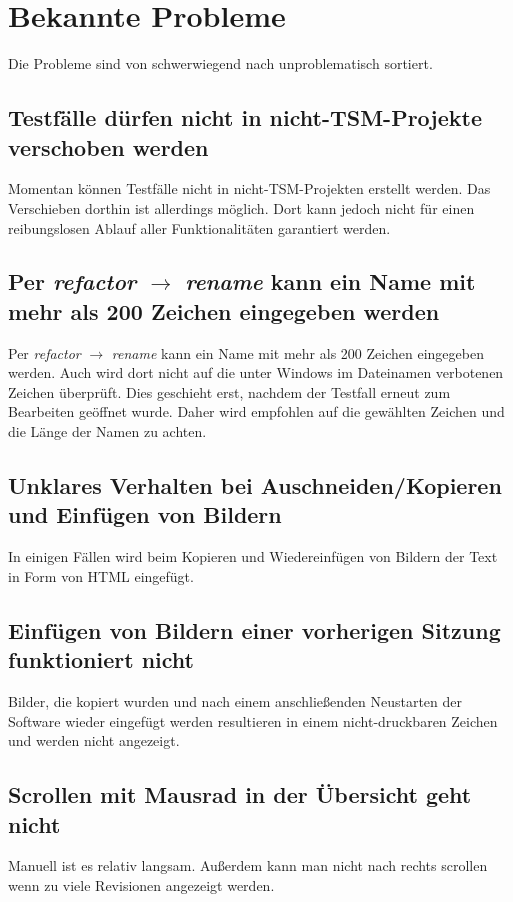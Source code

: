 \documentclass[11pt,a4paper,titlepage]{article}
\begin{document}
\section{Bekannte Probleme}
Die Probleme sind von schwerwiegend nach unproblematisch sortiert.\\

\subsection*{Testfälle dürfen nicht in nicht-TSM-Projekte verschoben werden}
Momentan können Testfälle nicht in nicht-TSM-Projekten erstellt werden. Das Verschieben dorthin ist allerdings möglich.
Dort kann jedoch nicht für einen reibungslosen Ablauf aller Funktionalitäten garantiert werden.

\subsection*{Per \textit{refactor} $ \rightarrow $ \textit{rename} kann ein Name mit mehr als 200 Zeichen eingegeben werden}
Per \textit{refactor} $ \rightarrow $ \textit{rename} kann ein Name mit mehr als 200 Zeichen eingegeben werden. 
Auch wird dort nicht auf die unter Windows im Dateinamen verbotenen Zeichen überprüft.
Dies geschieht erst, nachdem der Testfall erneut zum Bearbeiten geöffnet wurde. Daher wird empfohlen auf die gewählten Zeichen und die Länge der Namen zu achten.

\subsection*{Unklares Verhalten bei Auschneiden/Kopieren und Einfügen von Bildern}
In einigen Fällen wird beim Kopieren und Wiedereinfügen von Bildern der Text in Form von HTML eingefügt.

\subsection*{Einfügen von Bildern einer vorherigen Sitzung funktioniert nicht}
Bilder, die kopiert wurden und nach einem anschließenden Neustarten der Software wieder eingefügt werden resultieren in einem nicht-druckbaren Zeichen und werden nicht angezeigt.

\subsection*{Scrollen mit Mausrad in der Übersicht geht nicht}
Manuell ist es relativ langsam. Außerdem kann man nicht nach rechts scrollen wenn zu viele Revisionen angezeigt werden.
\end{document}
